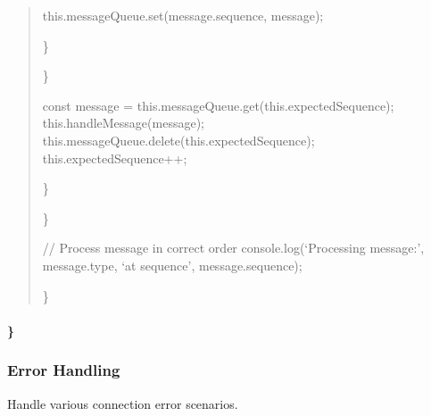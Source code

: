 \documentclass[letterpaper,10pt,english]{sphinxmanual}
\begin{document}
\begin{quote}
\begin{description}
\begin{description}
\sphinxAtStartPar
this.messageQueue.set(message.sequence, message);

\end{description}

\sphinxAtStartPar
\}

\end{description}

\sphinxAtStartPar
\}
\begin{description}
\begin{description}
\sphinxAtStartPar
const message = this.messageQueue.get(this.expectedSequence);
this.handleMessage(message);
this.messageQueue.delete(this.expectedSequence);
this.expectedSequence++;

\end{description}

\sphinxAtStartPar
\}

\end{description}

\sphinxAtStartPar
\}
\begin{description}
\sphinxAtStartPar
// Process message in correct order
console.log(‘Processing message:’, message.type, ‘at sequence’, message.sequence);

\end{description}

\sphinxAtStartPar
\}
\end{quote}


\paragraph{\}}
\label{\detokenize{api/websocket-api:id125}}

\subsubsection{Error Handling}
\label{\detokenize{api/websocket-api:error-handling}}
\sphinxAtStartPar
Handle various connection error scenarios.
\end{document}
